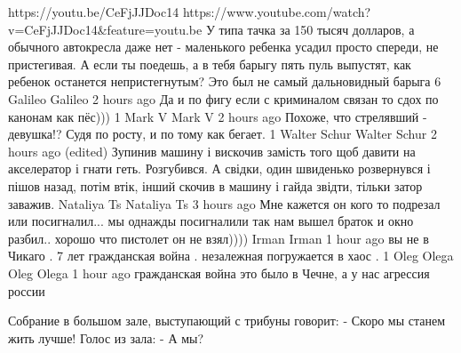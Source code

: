 https://youtu.be/CeFjJJDoc14
https://www.youtube.com/watch?v=CeFjJJDoc14&feature=youtu.be
У типа тачка за 150 тысяч долларов, а обычного автокресла даже нет - маленького ребенка усадил просто спереди, не пристегивая. А если ты поедешь, а в тебя барыгу пять пуль выпустят, как ребенок останется непристегнутым? Это был не самый дальновидный барыга
6
Galileo
Galileo
2 hours ago
Да и по фигу если с криминалом связан то сдох по канонам как пёс)))
1
Mark V
Mark V
2 hours ago
Похоже, что стрелявший - девушка!? Судя по росту, и по тому как бегает.
1
Walter Schur
Walter Schur
2 hours ago (edited)
Зупинив машину і вискочив замість того щоб давити на акселератор і гнати геть. Розгубився. А свідки, один швиденько розвернувся і пішов назад, потім втік, інший скочив в машину і гайда звідти, тільки затор заважив.
Nataliya Ts
Nataliya Ts
3 hours ago
Мне кажется он кого то подрезал или посигналил... мы однажды посигналили так нам вышел браток и окно разбил.. хорошо что пистолет он не взял))))
Irman
Irman
1 hour ago
вы не  в Чикаго . 7 лет гражданская война . незалежная погружается в хаос .
1
Oleg Olega
Oleg Olega
1 hour ago
гражданская война это было в Чечне, а у нас агрессия россии 






Собрание в большом зале, выступающий с трибуны говорит:
- Скоро мы станем жить лучше!
Голос из зала: 
- А мы?

